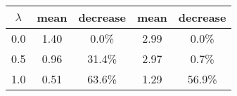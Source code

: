 \begin{tabular}{c||c|c||c|c}
\toprule
 $\lambda$ &  mean & decrease &  mean & decrease \\
\midrule
       0.0 &  1.40 &    0.0\% &  2.99 &    0.0\% \\
       0.5 &  0.96 &   31.4\% &  2.97 &    0.7\% \\
       1.0 &  0.51 &   63.6\% &  1.29 &   56.9\% \\
\bottomrule
\end{tabular}

